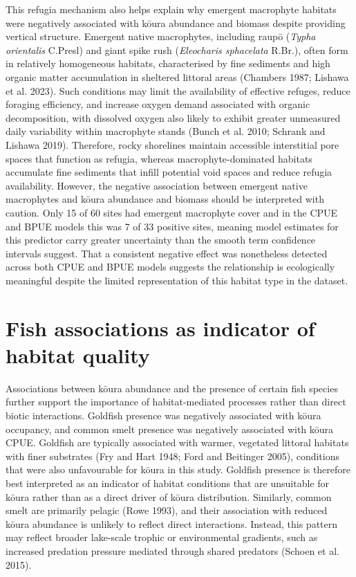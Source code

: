 \documentclass[
  12pt,
  a4paper,
]{scrbook}
\newcounter{none} %
\begin{document}
This refugia mechanism also helps explain why emergent macrophyte
habitats were negatively associated with kōura abundance and biomass
despite providing vertical structure. Emergent native macrophytes,
including raupō (\emph{Typha orientalis} C.Presl) and giant spike rush
(\emph{Eleocharis sphacelata} R.Br.), often form in relatively
homogeneous habitats, characterised by fine sediments and high organic
matter accumulation in sheltered littoral areas (Chambers 1987; Lishawa
et al. 2023). Such conditions may limit the availability of effective
refuges, reduce foraging efficiency, and increase oxygen demand
associated with organic decomposition, with dissolved oxygen also likely
to exhibit greater unmeasured daily variability within macrophyte stands
(Bunch et al. 2010; Schrank and Lishawa 2019). Therefore, rocky
shorelines maintain accessible interstitial pore spaces that function as
refugia, whereas macrophyte-dominated habitats accumulate fine sediments
that infill potential void spaces and reduce refugia availability.
However, the negative association between emergent native macrophytes
and kōura abundance and biomass should be interpreted with caution. Only
15 of 60 sites had emergent macrophyte cover and in the CPUE and BPUE
models this was 7 of 33 positive sites, meaning model estimates for this
predictor carry greater uncertainty than the smooth term confidence
intervals suggest. That a consistent negative effect was nonetheless
detected across both CPUE and BPUE models suggests the relationship is
ecologically meaningful despite the limited representation of this
habitat type in the dataset.

\section{Fish associations as indicator of habitat
quality}\label{fish-associations-as-indicator-of-habitat-quality}

Associations between kōura abundance and the presence of certain fish
species further support the importance of habitat-mediated processes
rather than direct biotic interactions. Goldfish presence was negatively
associated with kōura occupancy, and common smelt presence was
negatively associated with kōura CPUE. Goldfish are typically associated
with warmer, vegetated littoral habitats with finer substrates (Fry and
Hart 1948; Ford and Beitinger 2005), conditions that were also
unfavourable for kōura in this study. Goldfish presence is therefore
best interpreted as an indicator of habitat conditions that are
unsuitable for kōura rather than as a direct driver of kōura
distribution. Similarly, common smelt are primarily pelagic (Rowe 1993),
and their association with reduced kōura abundance is unlikely to
reflect direct interactions. Instead, this pattern may reflect broader
lake-scale trophic or environmental gradients, such as increased
predation pressure mediated through shared predators (Schoen et al.
2015).
\end{document}

